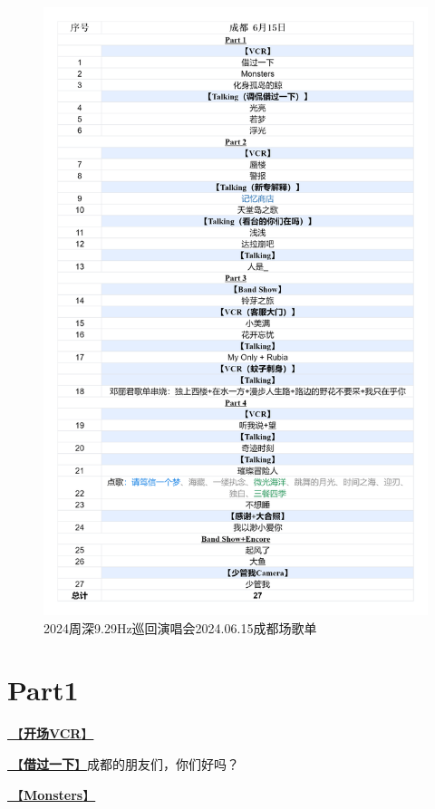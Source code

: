 \documentclass[]{ctexbook}
\begin{document}
\begin{figure}

{\centering \includegraphics[width=320pt]{img/playlists/playlists-chengdu-20240615} 

}

\caption{2024周深9.29Hz巡回演唱会2024.06.15成都场歌单}\label{fig:unnamed-chunk-45}
\end{figure}

\newpage

\section{Part1}\label{chengdu-20240615-part1}

\hyperref[opening-vcr]{🎥【\textbf{开场VCR}】}

\hyperref[I-will-go-my-way]{🎵【\textbf{借过一下}】}成都的朋友们，你们好吗？

\hyperref[Monsters]{🎵【\textbf{Monsters}】}
\end{document}
